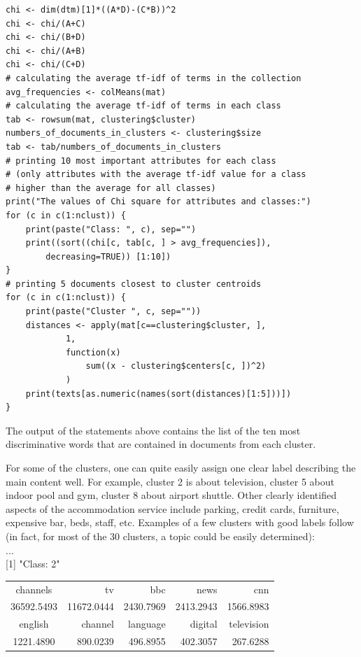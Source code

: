 \documentclass[10pt]{book}
\begin{document}
\begin{verbatim}
chi <- dim(dtm)[1]*((A*D)-(C*B))^2
chi <- chi/(A+C)
chi <- chi/(B+D)
chi <- chi/(A+B)
chi <- chi/(C+D)
# calculating the average tf-idf of terms in the collection
avg_frequencies <- colMeans(mat)
# calculating the average tf-idf of terms in each class
tab <- rowsum(mat, clustering$cluster)
numbers_of_documents_in_clusters <- clustering$size
tab <- tab/numbers_of_documents_in_clusters
# printing 10 most important attributes for each class
# (only attributes with the average tf-idf value for a class
# higher than the average for all classes)
print("The values of Chi square for attributes and classes:")
for (c in c(1:nclust)) {
    print(paste("Class: ", c), sep="")
    print((sort((chi[c, tab[c, ] > avg_frequencies]),
        decreasing=TRUE)) [1:10])
}
# printing 5 documents closest to cluster centroids
for (c in c(1:nclust)) {
    print(paste("Cluster ", c, sep=""))
    distances <- apply(mat[c==clustering$cluster, ],
            1,
            function(x)
                sum((x - clustering$centers[c, ])^2)
            )
    print(texts[as.numeric(names(sort(distances)[1:5]))])
}
\end{verbatim}

The output of the statements above contains the list of the ten most discriminative words that are contained in documents from each cluster.

For some of the clusters, one can quite easily assign one clear label describing the main content well. For example, cluster 2 is about television, cluster 5 about indoor pool and gym, cluster 8 about airport shuttle. Other clearly identified aspects of the accommodation service include parking, credit cards, furniture,\\
expensive bar, beds, staff, etc. Examples of a few clusters with good labels follow (in fact, for most of the 30 clusters, a topic could be easily determined):\\
...\\[0pt]
[1] "Class: 2"

\begin{center}
\begin{tabular}{crrrr}
channels & tv & bbc & news & cnn \\
36592.5493 & 11672.0444 & 2430.7969 & 2413.2943 & 1566.8983 \\
english & channel & language & digital & television \\
1221.4890 & 890.0239 & 496.8955 & 402.3057 & 267.6288 \\
\end{tabular}
\end{center}
\end{document}
